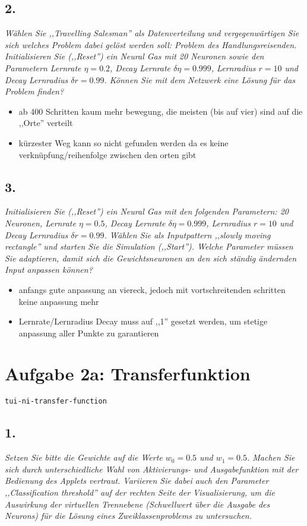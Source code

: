 \documentclass[a4paper,10pt,titlepage]{scrartcl}
\begin{document}
\subsection*{2.}
\textit{Wählen Sie ,,Travelling Salesman'' als Datenverteilung und vergegenwärtigen Sie sich welches Problem dabei gelöst werden soll: Problem des Handlungsreisenden. Initialisieren Sie (,,Reset'') ein Neural Gas mit 20 Neuronen sowie den Parametern Lernrate $\eta=0.2$, Decay Lernrate $\delta\eta=0.999$, Lernradius $r=10$ und Decay Lernradius $\delta r=0.99$. Können Sie mit dem Netzwerk eine Lösung für das Problem finden?}
\begin{itemize}
    \item ab 400 Schritten kaum mehr bewegung, die meisten (bis auf vier) sind auf die ,,Orte'' verteilt
    \item kürzester Weg kann so nicht gefunden werden da es keine verknüpfung/reihenfolge zwischen den orten gibt
\end{itemize}

\subsection*{3.}
\textit{Initialisieren Sie (,,Reset'') ein Neural Gas mit den folgenden Parametern: 20 Neuronen, Lernrate $\eta=0.5$, Decay Lernrate $\delta\eta=0.999$, Lernradius $r=10$ und Decay Lernradius $\delta r=0.99$. Wählen Sie als Inputpattern ,,slowly moving rectangle'' und starten Sie die Simulation (,,Start''). Welche Parameter müssen Sie adaptieren, damit sich die Gewichtsneuronen an den sich ständig ändernden Input anpassen können?}
\begin{itemize}
    \item anfangs gute anpassung an viereck, jedoch mit vortschreitenden schritten keine anpassung mehr
    \item Lernrate/Lernradius Decay muss auf ,,1'' gesetzt werden, um stetige anpassung aller Punkte zu garantieren
\end{itemize}

\section*{Aufgabe 2a: Transferfunktion}
\lstinline{tui-ni-transfer-function}
\subsection*{1.}
\textit{Setzen Sie bitte die Gewichte auf die Werte $w_0=0.5$ und $w_1=0.5$. Machen Sie sich durch unterschiedliche Wahl von Aktivierungs- und Ausgabefunktion mit der Bedienung des Applets vertraut. Variieren Sie dabei auch den Parameter ,,Classification threshold'' auf der rechten Seite der Visualisierung, um die Auswirkung der virtuellen Trennebene (Schwellwert über die Ausgabe des Neurons) für die Lösung eines Zweiklassenproblems zu untersuchen.}
\end{document}
